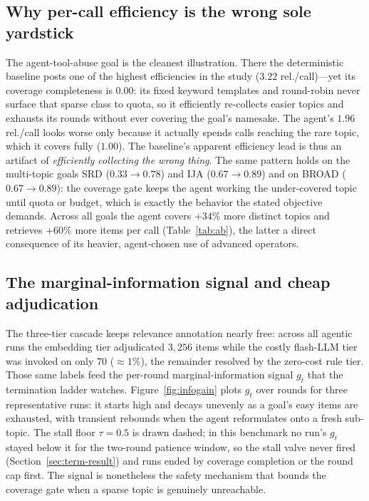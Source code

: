 \documentclass[conference]{IEEEtran}
\begin{document}
\subsection{Why per-call efficiency is the wrong sole yardstick}

The agent-tool-abuse goal is the cleanest illustration. There the deterministic baseline posts one of the highest efficiencies in the study ($3.22$ rel./call)---yet its coverage completeness is $0.00$: its fixed keyword templates and round-robin never surface that sparse class to quota, so it efficiently re-collects easier topics and exhausts its rounds without ever covering the goal's namesake. The agent's $1.96$ rel./call looks worse only because it actually spends calls reaching the rare topic, which it covers fully ($1.00$). The baseline's apparent efficiency lead is thus an artifact of \emph{efficiently collecting the wrong thing}. The same pattern holds on the multi-topic goals SRD ($0.33\!\to\!0.78$) and IJA ($0.67\!\to\!0.89$) and on BROAD ($0.67\!\to\!0.89$): the coverage gate keeps the agent working the under-covered topic until quota or budget, which is exactly the behavior the stated objective demands. Across all goals the agent covers $+34\%$ more distinct topics and retrieves $+60\%$ more items per call (Table~\ref{tab:ab}), the latter a direct consequence of its heavier, agent-chosen use of advanced operators.

\subsection{The marginal-information signal and cheap adjudication}

The three-tier cascade keeps relevance annotation nearly free: across all agentic runs the embedding tier adjudicated $3{,}256$ items while the costly flash-LLM tier was invoked on only $70$ ($\approx 1\%$), the remainder resolved by the zero-cost rule tier. Those same labels feed the per-round marginal-information signal $g_t$ that the termination ladder watches. Figure~\ref{fig:infogain} plots $g_t$ over rounds for three representative runs: it starts high and decays unevenly as a goal's easy items are exhausted, with transient rebounds when the agent reformulates onto a fresh sub-topic. The stall floor $\tau=0.5$ is drawn dashed; in this benchmark no run's $g_t$ stayed below it for the two-round patience window, so the stall valve never fired (Section~\ref{sec:term-result}) and runs ended by coverage completion or the round cap first. The signal is nonetheless the safety mechanism that bounds the coverage gate when a sparse topic is genuinely unreachable.
\end{document}
